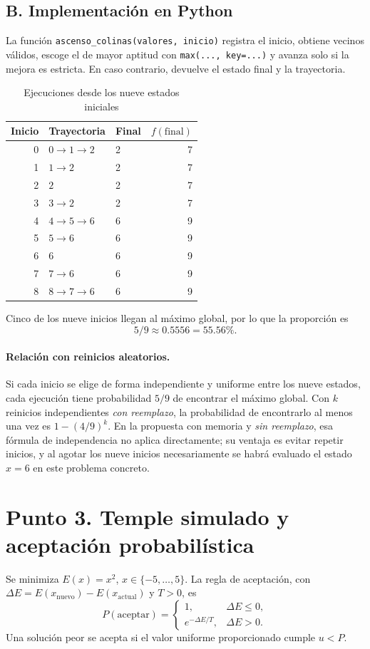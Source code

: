 \documentclass[11pt,a4paper]{article}
\begin{document}
\subsection{B. Implementación en Python}
La función \texttt{ascenso\_colinas(valores, inicio)} registra el inicio, obtiene vecinos válidos, escoge el de mayor aptitud con \texttt{max(..., key=...)} y avanza solo si la mejora es estricta. En caso contrario, devuelve el estado final y la trayectoria.
\begin{table}[H]\centering\caption{Ejecuciones desde los nueve estados iniciales}\begin{tabular}{rllr}\toprule Inicio & Trayectoria & Final & $f(\text{final})$\\\midrule
0&$0\to1\to2$&2&7\\1&$1\to2$&2&7\\2&$2$&2&7\\3&$3\to2$&2&7\\4&$4\to5\to6$&6&9\\5&$5\to6$&6&9\\6&$6$&6&9\\7&$7\to6$&6&9\\8&$8\to7\to6$&6&9\\\bottomrule\end{tabular}\end{table}
Cinco de los nueve inicios llegan al máximo global, por lo que la proporción es
\[\boxed{5/9\approx0.5556=55.56\%}.\]
\paragraph{Relación con reinicios aleatorios.} Si cada inicio se elige de forma independiente y uniforme entre los nueve estados, cada ejecución tiene probabilidad $5/9$ de encontrar el máximo global. Con $k$ reinicios independientes \emph{con reemplazo}, la probabilidad de encontrarlo al menos una vez es $1-(4/9)^k$. En la propuesta con memoria y \emph{sin reemplazo}, esa fórmula de independencia no aplica directamente; su ventaja es evitar repetir inicios, y al agotar los nueve inicios necesariamente se habrá evaluado el estado $x=6$ en este problema concreto.

\section{Punto 3. Temple simulado y aceptación probabilística}
Se minimiza $E(x)=x^2$, $x\in\{-5,\dots,5\}$. La regla de aceptación, con $\Delta E=E(x_{\mathrm{nuevo}})-E(x_{\mathrm{actual}})$ y $T>0$, es
\[
P(\mathrm{aceptar})=\begin{cases}1,&\Delta E\le0,\\e^{-\Delta E/T},&\Delta E>0.\end{cases}
\]
Una solución peor se acepta si el valor uniforme proporcionado cumple $u<P$.
\end{document}

